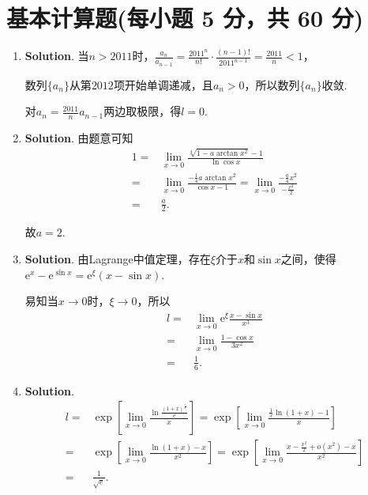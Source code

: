 \documentclass[../Main.tex]{subfiles}
\begin{document}
\section{基本计算题(每小题 5 分，共 60 分)}
\begin{enumerate}
    \item \textbf{Solution}. 当$n>2011$时，$\frac{a_{n}}{a_{n-1}}=\frac{2011^{n}}{n!}
              \cdot\frac{(n-1)!}{2011^{n-1}}=\frac{2011}{n}<1$，

          数列$\{a_{n}\}$从第$2012$项开始单调递减，且$a_{n}>0$，所以数列$\{a_{n}\}$收敛.

          对$a_{n} = \frac{2011}{n}a_{n-1}$两边取极限，得$l=0$.

    \item \textbf{Solution}. 由题意可知
          \[
              \begin{aligned}
                  1 = & \lim_{x\to 0}\frac{\sqrt[4]{1-a\arctan x^2}-1}{\ln\cos x}                                                  \\
                  =   & \lim_{x\to0}\frac{-\frac{1}{4}a\arctan x^2}{\cos x-1}=\lim_{x\to 0}\frac{-\frac{a}{4} x^2}{-\frac{x^2}{2}} \\
                  =   & \frac{a}{2}.
              \end{aligned}
          \]

          故$a=2$.

    \item \textbf{Solution}. 由Lagrange中值定理，存在$\xi$介于$x$和$\sin x$之间，使得$\mathrm{e}
              ^{x}-\mathrm{e}^{\sin x}=\mathrm{e}^{\xi}(x-\sin x)$.

          易知当$x\to0$时，$\xi\to0$，所以
          \[
              \begin{aligned}
                  l= & \lim_{x\to0}\mathrm{e}^{\xi}\frac{x-\sin x}{x^3} \\
                  =  & \lim_{x\to0}\frac{1-\cos x}{3x^2}                \\
                  =  & \frac{1}{6}.
              \end{aligned}
          \]

    \item \textbf{Solution}.
          \[
              \begin{aligned}
                  l = & \exp\left[\lim_{x\to0}\frac{\ln\frac{(1+x)^{\frac{1}{x}}}{\mathrm{e}}}{x}\right]=\exp\left[\lim_{x\to0}\frac{\frac{1}{x}\ln(1+x)-1}{x}\right] \\
                  =   & \exp\left[\lim_{x\to0}\frac{\ln(1+x)-x}{x^2}\right]=\exp\left[\lim_{x\to0}\frac{x-\frac{x^2}{2}+o(x^2)-x}{x^2}\right]                         \\
                  =   & \frac{1}{\sqrt{e}}.
              \end{aligned}
          \]


\end{enumerate}
\end{document}
